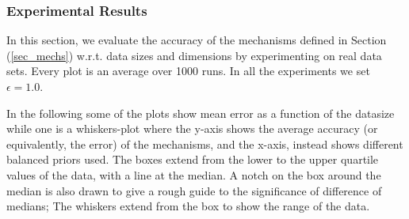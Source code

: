 \documentclass{article}
\begin{document}
\subsubsection{Experimental Results}
\label{subsec_vs_variables}

In this section, we evaluate the accuracy of the mechanisms defined in
Section (\ref{sec_mechs}) w.r.t. data sizes and dimensions by experimenting on real data sets.
Every plot is an average over 1000 runs. In all the experiments we set
$\epsilon = 1.0$.

\noindent In the following some of the plots show
mean error as a function of the datasize while one
is a whiskers-plot where the y-axis shows the average
accuracy (or equivalently, the error) of the mechanisms, and the x-axis, instead shows
different balanced priors used. The boxes extend from the lower to the upper quartile values
of the data, with a line at the median. A notch on the box around the
median is also drawn to give a rough guide to the significance of
difference of medians; The whiskers extend from the box to show the
range of the data. 




\end{document}
